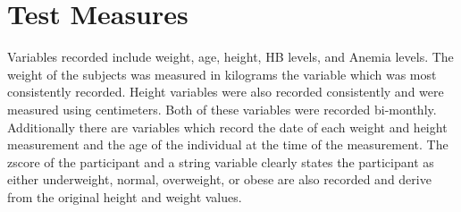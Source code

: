 \documentclass{article}
\begin{document}
\begin{figure}[!htb]\centering
   \begin{minipage}{0.49\textwidth}
   \end{minipage}
   \begin {minipage}{0.49\textwidth}
   \end{minipage}
\end{figure}

\section{Test Measures}
Variables recorded include weight, age, height, HB levels, and Anemia levels. The weight of the subjects was measured in kilograms the variable which was most consistently recorded. Height variables were also recorded consistently and were measured using centimeters. Both of these variables were recorded bi-monthly. Additionally there are variables which record the date of each weight and height measurement and the age of the individual at the time of the measurement. The zscore of the participant and a string variable clearly states the participant as either underweight, normal, overweight, or obese are also recorded and derive from the original height and weight values.
\end{document}
